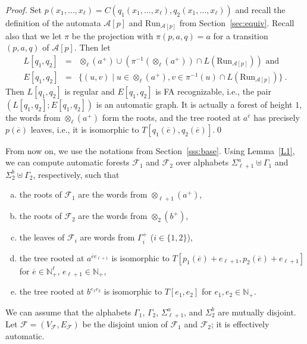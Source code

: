 \documentclass[envcountsame]{llncs}
\newcommand{\A}{\mathcal A}
\newcommand{\N}{\mathbb N}
\newcommand{\Run}{\mathrm{Run}}
\begin{document}
\begin{proof}
  Set $p(x_1,\ldots,x_\ell)=C(q_1(x_1,\ldots,x_\ell),q_2(x_1,\ldots,x_\ell))$
  and recall the definition of the automata $\A[p]$ and $\Run_{\A[p]}$
  from Section~\ref{sec:equiv}.  Recall also that we let $\pi$ be the
  projection with $\pi(p,a,q)=a$ for a transition $(p,a,q)$ of $\A[p]$.
  Then let
  \begin{eqnarray*}
  L[q_1,q_2] & = & \otimes_\ell(a^+) \cup (\pi^{-1}(\otimes_\ell(a^+)) \cap L(\Run_{\A[p]}))\text{ and } \\
  E[q_1,q_2] & = & \{ (u,v) \mid u\in \otimes_\ell(a^+), v\in \pi^{-1}(u) \cap L(\Run_{\A[p]}) \} \ .
  \end{eqnarray*}
  Then $L[q_1,q_2]$ is regular and
  $E[q_1,q_2]$ is FA recognizable, i.e., the pair $(L[q_1,q_2];E[q_1,q_2])$
  is an automatic graph. It is actually a forest of height $1$, the
  words from $\otimes_\ell(a^+)$ form the roots, and the tree rooted
  at $a^{\overline{e}}$ has precisely
  $p(\overline{e})$ leaves, i.e., it is isomorphic to
  $T[q_1(\overline e),q_2(\overline e)]$.\qed
\end{proof}
{}From now on, we use the notations from Section~\ref{sss:base}.
Using Lemma~\ref{L1}, we can compute automatic forests $\mathcal F_1$
and $\mathcal F_2$ over alphabets
$\Sigma_{\ell+1}^a \uplus\Gamma_1$ and
$\Sigma_2^b \uplus\Gamma_2$, respectively, such that
\begin{enumerate}[(a)]
  \item the roots of $\mathcal F_1$ are the words from
    $\otimes_{\ell+1}(a^+)$,
  \item the roots of $\mathcal F_2$ are the words from $\otimes_2(b^+)$,
  \item the leaves of $\mathcal F_i$ are words from $\Gamma_i^+$ ($i \in \{1,2\}$),
  \item the tree rooted at $a^{\overline{e} e_{\ell+1}}$
    is isomorphic to $T[p_1(\overline e)+e_{\ell+1},p_2(\overline
    e)+e_{\ell+1}]$ for $\overline e \in\N_+^{\ell}$, $e_{\ell+1}\in\N_+$,
  \item the tree rooted at $b^{e_1 e_2}$ is isomorphic to
    $T[e_1,e_2]$ for $e_1,e_2\in\N_+$.
\end{enumerate}
We can assume that the alphabets $\Gamma_1$, $\Gamma_2$,
$\Sigma_{\ell+1}^a$, and $\Sigma_2^b$ are mutually disjoint.
Let $\mathcal F=(V_{\mathcal F},E_{\mathcal F})$ be the disjoint union of $\mathcal F_1$
and $\mathcal F_2$; it is effectively automatic.
\end{document}
